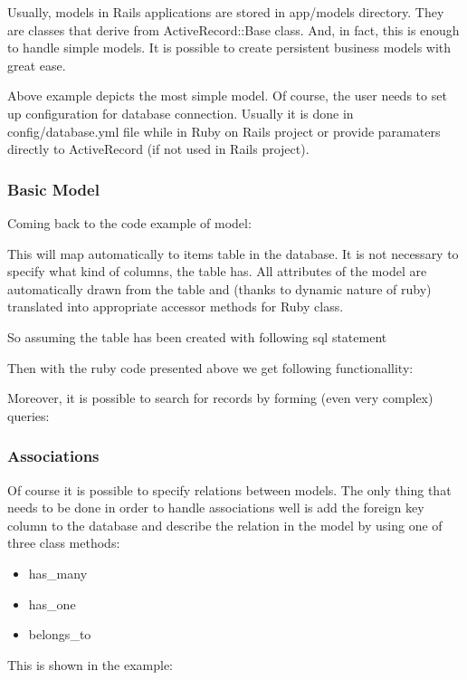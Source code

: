       Usually, models in Rails applications are stored in app/models directory. They are classes that
      derive from ActiveRecord::Base class. And, in fact, this is enough to handle simple models. 
      It is possible to create persistent business models with great ease.

      

      Above example depicts the most simple model. Of course, the user needs to set up configuration
      for database connection. Usually it is done in config/database.yml file while in Ruby on Rails project
      or provide paramaters directly to ActiveRecord (if not used in Rails project). 

      

      \subsubsection{Basic Model}
      Coming back to the code example of model:

      

      This will map automatically to items table in the database. It is not necessary to specify
      what kind of columns, the table has. All attributes of the model are automatically
      drawn from the table and (thanks to dynamic nature of ruby) translated into appropriate
      accessor methods for Ruby class.

      So assuming the table has been created with following sql statement

       

      Then with the ruby code presented above we get following functionallity:

       

      Moreover, it is possible to search for records by forming (even very complex) queries:

      

      \subsubsection{Associations}
      Of course it is possible to specify relations between models. The only thing that
      needs to be done in order to handle associations well is add the foreign key
      column to the database and describe the relation in the model by using one of three
      class methods:
        \begin{itemize}
          \item{has\_many}
          \item{has\_one}
          \item{belongs\_to}
        \end{itemize}
      This is shown in the example:

